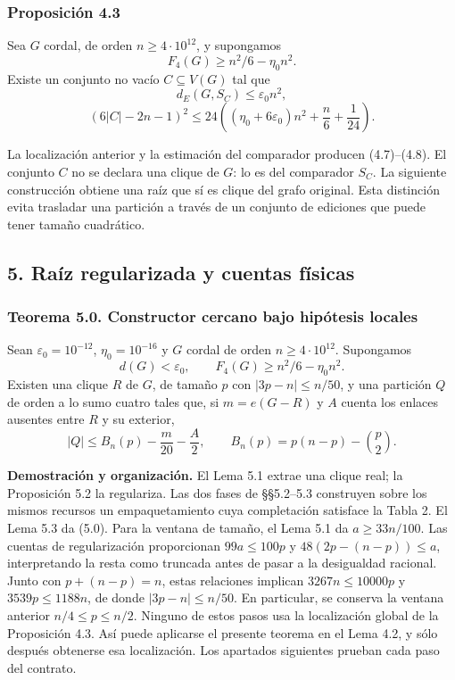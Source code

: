 \documentclass[spanish,11pt,a4paper]{article}
\begin{document}
\subsubsection{Proposición 4.3}\label{proposicion-4.3}

Sea \(G\) cordal, de orden \(n\ge4\cdot10^{12}\), y supongamos \[
F_4(G)\ge n^2/6-\eta_0n^2.
\] Existe un conjunto no vacío \(C\subseteq V(G)\) tal que \[
d_E(G,S_C)\le\varepsilon_0n^2,
\tag{4.7}
\] \[
(6|C|-2n-1)^2
\le24\left((\eta_0+6\varepsilon_0)n^2+\frac n6+\frac1{24}\right).
\tag{4.8}
\]

La localización anterior y la estimación del comparador producen (4.7)--(4.8). El conjunto \(C\) no se declara una clique de \(G\): lo es del comparador \(S_C\). La siguiente construcción obtiene una raíz que sí es clique del grafo original. Esta distinción evita trasladar una partición a través de un conjunto de ediciones que puede tener tamaño cuadrático.

\subsection{5. Raíz regularizada y cuentas físicas}\label{raiz-regularizada-y-cuentas-fisicas}

\subsubsection{Teorema 5.0. Constructor cercano bajo hipótesis locales}\label{teorema-5.0.-constructor-cercano-bajo-hipotesis-locales}

Sean \(\varepsilon_0=10^{-12}\), \(\eta_0=10^{-16}\) y \(G\) cordal de orden \(n\ge4\cdot10^{12}\). Supongamos \[
d(G)<\varepsilon_0,\qquad F_4(G)\ge n^2/6-\eta_0n^2.
\] Existen una clique \(R\) de \(G\), de tamaño \(p\) con \(|3p-n|\le n/50\), y una partición \(Q\) de orden a lo sumo cuatro tales que, si \(m=e(G-R)\) y \(A\) cuenta los enlaces ausentes entre \(R\) y su exterior, \[
|Q|\le B_n(p)-\frac m{20}-\frac A2,\qquad
B_n(p)=p(n-p)-\binom p2.
\tag{5.0}
\]

\textbf{Demostración y organización.} El Lema 5.1 extrae una clique real; la Proposición 5.2 la regulariza. Las dos fases de §§5.2--5.3 construyen sobre los mismos recursos un empaquetamiento cuya completación satisface la Tabla 2. El Lema 5.3 da (5.0). Para la ventana de tamaño, el Lema 5.1 da \(a\ge33n/100\). Las cuentas de regularización proporcionan \(99a\le100p\) y \(48(2p-(n-p))\le a\), interpretando la resta como truncada antes de pasar a la desigualdad racional. Junto con \(p+(n-p)=n\), estas relaciones implican \(3267n\le10000p\) y \(3539p\le1188n\), de donde \(|3p-n|\le n/50\). En particular, se conserva la ventana anterior \(n/4\le p\le n/2\). Ninguno de estos pasos usa la localización global de la Proposición 4.3. Así puede aplicarse el presente teorema en el Lema 4.2, y sólo después obtenerse esa localización. Los apartados siguientes prueban cada paso del contrato.
\end{document}
